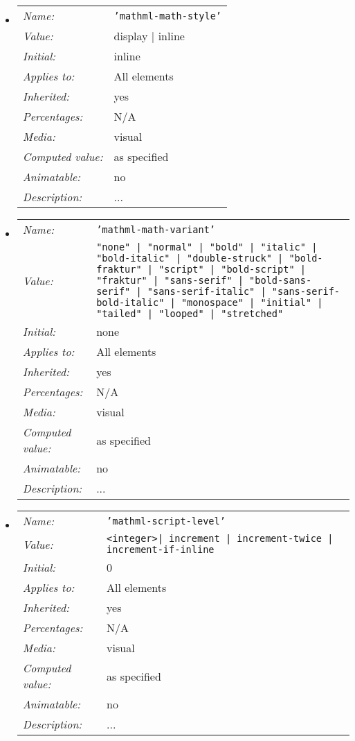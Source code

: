 \begin{itemize}

\item \begin{tabular}{ll}\label{CSSScriptMathStyle}
  \emph{Name:} & {\tt 'mathml-math-style'} \\
  \emph{Value:} & display | inline \\
  \emph{Initial:} & inline \\
  \emph{Applies to:} & All elements \\
  \emph{Inherited:} & yes \\
  \emph{Percentages:} & N/A \\
  \emph{Media:} & visual \\
  \emph{Computed value:} & as specified \\
  \emph{Animatable:} & no \\
  \emph{Description:} & ...
\end{tabular}

\item \begin{tabular}{ll}\label{CSSScriptMathVariant}
  \emph{Name:} & {\tt 'mathml-math-variant'} \\
  \emph{Value:} & {\tt "none" | "normal" | "bold" | "italic" | "bold-italic" |
  "double-struck" | "bold-fraktur" | "script" | "bold-script" | "fraktur" |
  "sans-serif" | "bold-sans-serif" | "sans-serif-italic" |
  "sans-serif-bold-italic" | "monospace" | "initial" | "tailed" | "looped" |
  "stretched"} \\
  \emph{Initial:} & none \\
  \emph{Applies to:} & All elements \\
  \emph{Inherited:} & yes \\
  \emph{Percentages:} & N/A \\
  \emph{Media:} & visual \\
  \emph{Computed value:} & as specified \\
  \emph{Animatable:} & no \\
  \emph{Description:} & ...
\end{tabular}

\item \begin{tabular}{ll}\label{CSSScriptLevel}
  \emph{Name:} & {\tt 'mathml-script-level'} \\
  \emph{Value:} & {\tt \textless integer\textgreater |
  increment | increment-twice | increment-if-inline} \\
  \emph{Initial:} & 0 \\
  \emph{Applies to:} & All elements \\
  \emph{Inherited:} & yes \\
  \emph{Percentages:} & N/A \\
  \emph{Media:} & visual \\
  \emph{Computed value:} & as specified \\
  \emph{Animatable:} & no \\
  \emph{Description:} & ...
\end{tabular}


\end{itemize}
